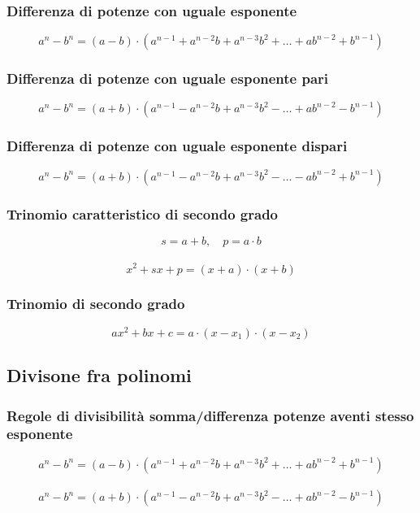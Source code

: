 \documentclass[a4paper,12pt]{article}
\theoremstyle{mystyle}
\begin{document}
\subsubsection{Differenza di potenze con uguale esponente}

\[a^n - b^n = (a-b) \cdot (a^{n-1} + a^{n-2}b + a^{n-3}b^2 + \ldots + ab^{n-2} + b^{n-1})  \]


\subsubsection{Differenza di potenze con uguale esponente pari}
\[a^n - b^n = (a+b) \cdot (a^{n-1} - a^{n-2}b + a^{n-3}b^2 - \ldots + ab^{n-2} - b^{n-1})\]

\subsubsection{Differenza di potenze con uguale esponente dispari}
\[a^n - b^n = (a + b) \cdot (a^{n-1} - a^{n-2}b + a^{n-3}b^2 - \ldots - ab^{n-2} + b^{n-1})\]

\subsubsection{Trinomio caratteristico di secondo grado}
\[s= a + b, \quad p = a \cdot b \]\\

\[x^2 + sx + p = (x+a) \cdot (x+b) \]

\subsubsection{Trinomio di secondo grado}
\[ax^2 + bx + c = a \cdot (x - x_1) \cdot (x - x_2)\]


\newpage

\subsection{Divisone fra polinomi}

\subsubsection{Regole di divisibilità somma/differenza potenze aventi stesso esponente}
\[a^n - b^n = (a-b) \cdot (a^{n-1} + a^{n-2}b + a^{n-3}b^2 + \ldots + ab^{n-2} + b^{n-1}) \]\\

\[a^n-b^n= (a+b) \cdot (a^{n-1}-a^{n-2}b + a^{n-3}b^2 - \ldots + ab^{n-2} - b^{n-1})\]\\
\end{document}
